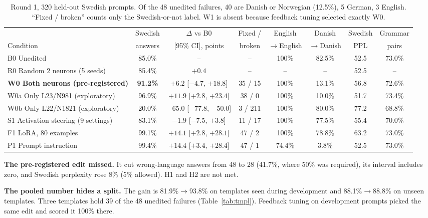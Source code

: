 \documentclass[10pt,a4paper]{article}
\newcommand{\up}{$\rightarrow$}
\begin{document}
\begin{table}[H]\footnotesize\centering\setlength{\tabcolsep}{4pt}
\begin{tabular}{@{}lccccccc@{}}
\toprule
 & Swedish & $\Delta$ vs B0 & Fixed / & English & Danish & Swedish & Grammar\\
Condition & answers & [95\% CI], points & broken & \up English & \up Danish & PPL & pairs\\
\midrule
B0 Unedited & 85.0\% & -- & -- & 100\% & 82.5\% & 52.5 & 73.0\%\\
R0 Random 2 neurons (5 seeds) & 85.4\% & $+0.4$ & -- & -- & -- & 52.5 & --\\
\textbf{W0 Both neurons (pre-registered)} & \textbf{91.2\%} & $+6.2$ [$-4.7$, $+18.8$] & 35 / 15 & 100\% & 13.1\% & 56.8 & 72.6\%\\
W0a Only L23/N981 (exploratory) & 96.9\% & $+11.9$ [$+2.8$, $+23.4$] & 38 / 0 & 100\% & 10.0\% & 51.7 & 73.4\%\\
W0b Only L22/N1821 (exploratory) & 20.0\% & $-65.0$ [$-77.8$, $-50.0$] & 3 / 211 & 100\% & 80.0\% & 77.2 & 68.8\%\\
S1 Activation steering (9 settings) & 83.1\% & $-1.9$ [$-7.5$, $+3.8$] & 11 / 17 & 100\% & 77.5\% & 55.4 & 70.0\%\\
F1 LoRA, 80 examples & 99.1\% & $+14.1$ [$+2.8$, $+28.1$] & 47 / 2 & 100\% & 78.8\% & 63.2 & 73.0\%\\
P1 Prompt instruction & 99.4\% & $+14.4$ [$+3.4$, $+28.4$] & 47 / 1 & 74.4\% & 3.8\% & 52.5 & 73.0\%\\
\bottomrule
\end{tabular}
\caption{Round 1, 320 held-out Swedish prompts. Of the 48 unedited failures, 40 are Danish or Norwegian (12.5\%), 5 German, 3 English. ``Fixed / broken'' counts only the Swedish-or-not label.
W1 is absent because feedback tuning selected exactly W0.}\label{tab:main}
\end{table}

\textbf{The pre-registered edit missed.} It cut wrong-language answers from 48 to 28 (41.7\%, where 50\% was required), its interval includes zero, and Swedish perplexity rose 8\% (5\% allowed). H1 and H2 are not met.

\textbf{The pooled number hides a split.} The gain is 81.9\%\up93.8\% on templates seen during development and 88.1\%\up88.8\% on unseen templates. Three templates hold 39 of the 48 unedited failures (Table~\ref{tab:tmpl}).
Feedback tuning on development prompts picked the same edit and scored it 100\% there.
\end{document}
